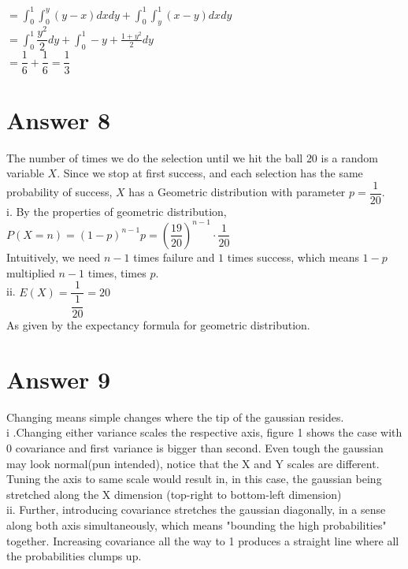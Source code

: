 \documentclass[12pt]{article}
\begin{document}
$ =  \displaystyle \int_0^1 \int_0^y (y-x) dx dy  +  \displaystyle \int_0^1 \int_y^1 (x-y) dx dy $ \\

$ =    \displaystyle \int_0^1 \dfrac{y^2}{2} dy  +  \displaystyle \int_0^1 -y+\frac{1+y^2}{2} dy $ \\

$ = \dfrac{1}{6} + \dfrac{1}{6} = \dfrac{1}{3} $

\section*{Answer 8}

The number of times we do the selection until we hit the ball $20$ is a random variable $X$. Since we stop at first success, and each selection has the same probability of success, $X$ has a Geometric distribution with parameter $p=\dfrac{1}{20}$. \\

i. By the properties of geometric distribution, $P(X=n) = (1-p)^{n-1}p = (\dfrac{19}{20})^{n-1}\cdot \dfrac{1}{20}$ \\

Intuitively, we need  $n-1$ times failure and $1$ times success, which means $1-p$ multiplied $n-1$ times, times $p$. \\

ii. $E(X) = \dfrac{1}{\dfrac{1}{20}} = 20 $ \\

As given by the expectancy formula for geometric distribution.\\



\section*{Answer 9}

Changing means simple changes where the tip of the gaussian resides. \\

i .Changing either variance scales the respective axis, figure 1 shows the case with 0 covariance and first variance is bigger than second. Even tough the gaussian may look normal(pun intended), notice that the X and Y scales are different. Tuning the axis to same scale would result in, in this case, the gaussian being stretched along the X dimension (top-right to bottom-left dimension)\\

ii. Further, introducing covariance stretches the gaussian diagonally, in a sense along both axis simultaneously, which means "bounding the high probabilities" together. Increasing covariance all the way to 1 produces a straight line where all the probabilities clumps up.\\
\end{document}

